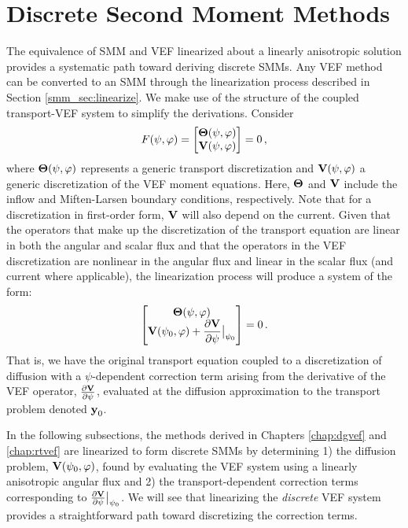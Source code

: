 \documentclass[../doc.tex]{subfiles}
\begin{document}
\section{Discrete Second Moment Methods}
The equivalence of SMM and VEF linearized about a linearly anisotropic solution provides a systematic path toward deriving discrete SMMs. Any VEF method can be converted to an SMM through the linearization process described in Section \ref{smm_sec:linearize}. We make use of the structure of the coupled transport-VEF system to simplify the derivations. Consider
	\begin{equation}
		F(\psi,\varphi) = \begin{bmatrix} 
			\boldsymbol{\mathrm{\Theta}}(\psi,\varphi) \\ \boldsymbol{\mathrm{V}}(\psi,\varphi) 
		\end{bmatrix} = 0\,,
	\end{equation}
where $\boldsymbol{\mathrm{\Theta}}(\psi,\varphi)$ represents a generic transport discretization and $\boldsymbol{\mathrm{V}}(\psi,\varphi)$ a generic discretization of the VEF moment equations. Here, $\boldsymbol{\mathrm{\Theta}}$ and $\boldsymbol{\mathrm{V}}$ include the inflow and Miften-Larsen boundary conditions, respectively. Note that for a discretization in first-order form, $\boldsymbol{\mathrm{V}}$ will also depend on the current. Given that the operators that make up the discretization of the transport equation are linear in both the angular and scalar flux and that the operators in the VEF discretization are nonlinear in the angular flux and linear in the scalar flux (and current where applicable), the linearization process will produce a system of the form: 
	\begin{equation}
		\begin{bmatrix} 
			\boldsymbol{\mathrm{\Theta}}(\psi,\varphi) \\
			\displaystyle\boldsymbol{\mathrm{V}}(\psi_0,\varphi) + \frac{\partial \boldsymbol{\mathrm{V}}}{\partial \psi}\big\rvert_{\psi_0}
		\end{bmatrix} = 0 \,. 
	\end{equation}
That is, we have the original transport equation coupled to a discretization of diffusion with a $\psi$-dependent correction term arising from the derivative of the VEF operator, $\frac{\partial \boldsymbol{\mathrm{V}}}{\partial \psi}$, evaluated at the diffusion approximation to the transport problem denoted $\boldsymbol{\mathrm{y}}_0$. 

In the following subsections, the methods derived in Chapters \ref{chap:dgvef} and \ref{chap:rtvef} are linearized to form discrete SMMs by determining 1) the diffusion problem, $\boldsymbol{\mathrm{V}}(\psi_0, \varphi)$, found by evaluating the VEF system using a linearly anisotropic angular flux and 2) the transport-dependent correction terms corresponding to $\frac{\partial \boldsymbol{\mathrm{V}}}{\partial \psi}\big\rvert_{\psi_0}$. We will see that linearizing the \emph{discrete} VEF system provides a straightforward path toward discretizing the correction terms. 
\end{document}
